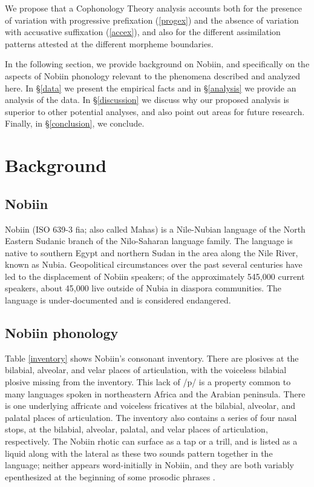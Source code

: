 \documentclass[output=paper]{langscibook}
\begin{document}
We propose that a Cophonology Theory analysis accounts both for the presence of variation with progressive prefixation (\ref{progex}) and the absence of variation with accusative suffixation (\ref{accex}), and also for the different assimilation patterns attested at the different morpheme boundaries.

In the following section, we provide background on Nobiin, and specifically on the aspects of Nobiin phonology relevant to the phenomena described and analyzed here. In \S \ref{data} we present the empirical facts and in \S \ref{analysis} we provide an analysis of the data. In \S \ref{discussion} we discuss why our proposed analysis is superior to other potential analyses, and also point out areas for future research. Finally, in \S \ref{conclusion}, we conclude.
 
\section{Background} \label{background}
\subsection{Nobiin}
Nobiin (ISO 639-3 fia; also called Mahas) is a Nile-Nubian language of the North Eastern Sudanic branch of the Nilo-Saharan language family. The language is native to southern Egypt and northern Sudan in the area along the Nile River, known as Nubia. Geopolitical circumstances over the past several centuries have led to the displacement of Nobiin speakers; of the approximately 545,000 current speakers, about 45,000 live outside of Nubia in diaspora communities. The language is under-documented and is considered endangered.

\subsection{Nobiin phonology}\largerpage
Table \ref{inventory} shows Nobiin's consonant inventory. There are plosives at the bilabial, alveolar, and velar places of articulation, with the voiceless bilabial plosive missing from the inventory. This lack of /p/ is a property common to many languages spoken in northeastern Africa and the Arabian peninsula. There is one underlying affricate and voiceless fricatives at the bilabial, alveolar, and palatal places of articulation. The inventory also contains a series of four nasal stops, at the bilabial, alveolar, palatal, and velar places of articulation, respectively. The Nobiin rhotic can surface as a tap or a trill, and is listed as a liquid along with the lateral as these two sounds pattern together in the language; neither appears word-initially in Nobiin, and they are both variably epenthesized at the beginning of some prosodic phrases \citep{barzilaispips}. 
\end{document}
